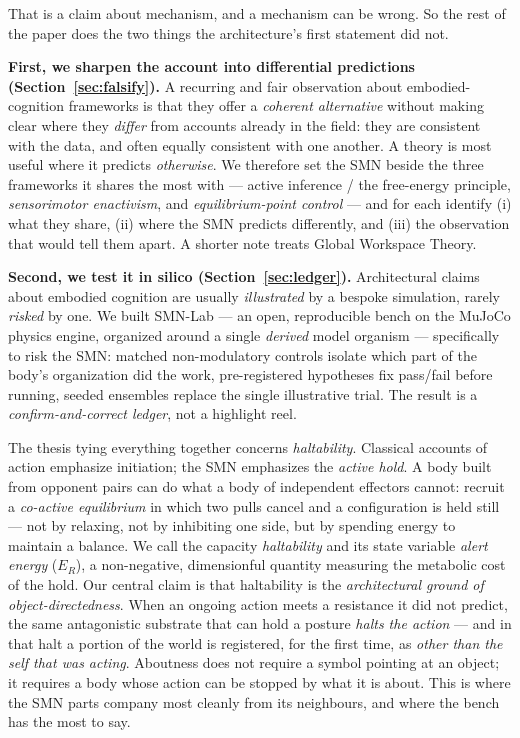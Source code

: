 \documentclass[utf8]{FrontiersinHarvard} %
\begin{document}
That is a claim about mechanism, and a mechanism can be wrong. So the rest of the paper does the two things the architecture's first statement \citep{NagarjunaKarnam2026SMN} did not.

\textbf{First, we sharpen the account into differential predictions (Section~\ref{sec:falsify}).} A recurring and fair observation about embodied-cognition frameworks is that they offer a \emph{coherent alternative} without making clear where they \emph{differ} from accounts already in the field: they are consistent with the data, and often equally consistent with one another. A theory is most useful where it predicts \emph{otherwise}. We therefore set the SMN beside the three frameworks it shares the most with --- active inference / the free-energy principle, \emph{sensorimotor enactivism}, and \emph{equilibrium-point control} --- and for each identify (i) what they share, (ii) where the SMN predicts differently, and (iii) the observation that would tell them apart. A shorter note treats Global Workspace Theory.

\textbf{Second, we test it in silico (Section~\ref{sec:ledger}).} Architectural claims about embodied cognition are usually \emph{illustrated} by a bespoke simulation, rarely \emph{risked} by one. We built SMN-Lab --- an open, reproducible bench on the MuJoCo physics engine, organized around a single \emph{derived} model organism --- specifically to risk the SMN: matched non-modulatory controls isolate which part of the body's organization did the work, pre-registered hypotheses fix pass/fail before running, seeded ensembles replace the single illustrative trial. The result is a \emph{confirm-and-correct ledger}, not a highlight reel.

The thesis tying everything together concerns \emph{haltability}. Classical accounts of action emphasize initiation; the SMN emphasizes the \emph{active hold}. A body built from opponent pairs can do what a body of independent effectors cannot: recruit a \emph{co-active equilibrium} in which two pulls cancel and a configuration is held still --- not by relaxing, not by inhibiting one side, but by spending energy to maintain a balance. We call the capacity \emph{haltability} and its state variable \emph{alert energy} ($E_R$), a non-negative, dimensionful quantity measuring the metabolic cost of the hold. Our central claim is that haltability is the \emph{architectural ground of object-directedness}. When an ongoing action meets a resistance it did not predict, the same antagonistic substrate that can hold a posture \emph{halts the action} --- and in that halt a portion of the world is registered, for the first time, as \emph{other than the self that was acting}. Aboutness does not require a symbol pointing at an object; it requires a body whose action can be stopped by what it is about. This is where the SMN parts company most cleanly from its neighbours, and where the bench has the most to say.
\end{document}

